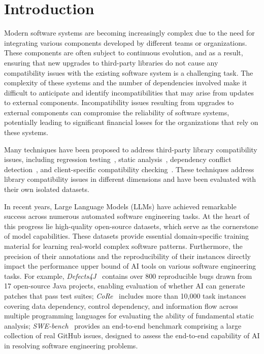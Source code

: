 \section{Introduction}\label{sec:introduction-compsuite}


Modern software systems are becoming increasingly complex due to the
need for integrating various components developed by different teams
or organizations. These components are often subject to continuous
evolution, and as a result, ensuring that new
upgrades to third-party libraries do not cause any compatibility
issues with the existing software system is a challenging task. The
complexity of these systems and the number of dependencies involved
make it difficult to anticipate and identify incompatibilities that
may arise from updates to external components. Incompatibility issues resulting from upgrades to external components can
compromise the reliability of software systems, potentially leading to
significant financial losses for the organizations that rely on these systems.

Many techniques have been proposed to address third-party library
compatibility issues, including regression
testing~\cite{mezzetti2018type,moller2019model}, static
analysis~\cite{foo2018efficient}, dependency conflict
detection~\cite{wang2021will}, and client-specific compatibility
checking~\cite{mora2018client,zhu2019framework}. These techniques address
library compatibility issues in different dimensions and have been
evaluated with their own isolated datasets.

In recent years, Large Language Models (LLMs) have achieved remarkable success across numerous automated software engineering tasks. At the heart of this progress lie high-quality open-source datasets, which serve as the cornerstone of model capabilities. These datasets provide essential domain-specific training material for learning real-world complex software patterns. Furthermore, the precision of their annotations and the reproducibility of their instances directly impact the performance upper bound of AI tools on various software engineering tasks. For example, \textit{Defects4J}~\cite{just2014defects4j} contains over 800 reproducible bugs drawn from 17 open-source Java projects, enabling evaluation of whether AI can generate patches that pass test suites; \textit{CoRe}~\cite{xie2025core} includes more than 10,000 task instances covering data dependency, control dependency, and information flow across multiple programming languages for evaluating the ability of fundamental static analysis; \textit{SWE-bench}~\cite{jimenez2024swebench} provides an end-to-end benchmark comprising a large collection of real GitHub issues, designed to assess the end-to-end capability of AI in resolving software engineering problems.

